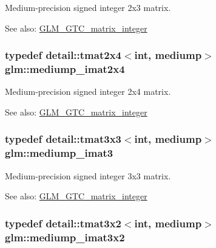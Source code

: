 Medium-precision signed integer 2x3 matrix. \begin{Desc}
\item[See also:]\hyperlink{group__gtc__matrix__integer}{GLM\_\-GTC\_\-matrix\_\-integer} \end{Desc}
\hypertarget{group__gtc__matrix__integer_g90b020de8489a1d4424c0ffcc17c83dd}{
\subsubsection[mediump\_\-imat2x4]{\setlength{\rightskip}{0pt plus 5cm}typedef detail::tmat2x4$<$int, mediump$>$ {\bf glm::mediump\_\-imat2x4}}}
\label{group__gtc__matrix__integer_g90b020de8489a1d4424c0ffcc17c83dd}


Medium-precision signed integer 2x4 matrix. \begin{Desc}
\item[See also:]\hyperlink{group__gtc__matrix__integer}{GLM\_\-GTC\_\-matrix\_\-integer} \end{Desc}
\hypertarget{group__gtc__matrix__integer_g6b438ab863af0122b532adc93b89105e}{
\subsubsection[mediump\_\-imat3]{\setlength{\rightskip}{0pt plus 5cm}typedef detail::tmat3x3$<$int, mediump$>$ {\bf glm::mediump\_\-imat3}}}
\label{group__gtc__matrix__integer_g6b438ab863af0122b532adc93b89105e}


Medium-precision signed integer 3x3 matrix. \begin{Desc}
\item[See also:]\hyperlink{group__gtc__matrix__integer}{GLM\_\-GTC\_\-matrix\_\-integer} \end{Desc}
\hypertarget{group__gtc__matrix__integer_g2a90775c74656b8a825f24d510f0ea5d}{
\subsubsection[mediump\_\-imat3x2]{\setlength{\rightskip}{0pt plus 5cm}typedef detail::tmat3x2$<$int, mediump$>$ {\bf glm::mediump\_\-imat3x2}}}
\label{group__gtc__matrix__integer_g2a90775c74656b8a825f24d510f0ea5d}


